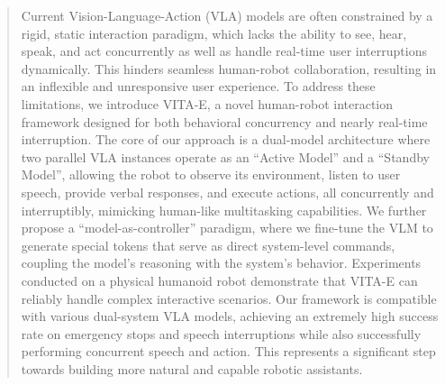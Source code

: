 \begin{abstract}
Current Vision-Language-Action (VLA) models are often constrained by a rigid, static interaction paradigm, which lacks the ability to see, hear, speak, and act concurrently as well as handle real-time user interruptions dynamically. This hinders seamless human-robot collaboration, resulting in an inflexible and unresponsive user experience. To address these limitations, we introduce VITA-E, a novel human-robot interaction framework designed for both behavioral concurrency and nearly real-time interruption. The core of our approach is a dual-model architecture where two parallel VLA instances operate as an ``Active Model'' and a ``Standby Model'', allowing the robot to observe its environment, listen to user speech, provide verbal responses, and execute actions, all concurrently and interruptibly, mimicking human-like multitasking capabilities. We further propose a ``model-as-controller'' paradigm, where we fine-tune the VLM to generate special tokens that serve as direct system-level commands, coupling the model's reasoning with the system's behavior. Experiments conducted on a physical humanoid robot demonstrate that VITA-E can reliably handle complex interactive scenarios. Our framework is compatible with various dual-system VLA models, achieving an extremely high success rate on emergency stops and speech interruptions while also successfully performing concurrent speech and action. This represents a significant step towards building more natural and capable robotic assistants. 


\end{abstract}
